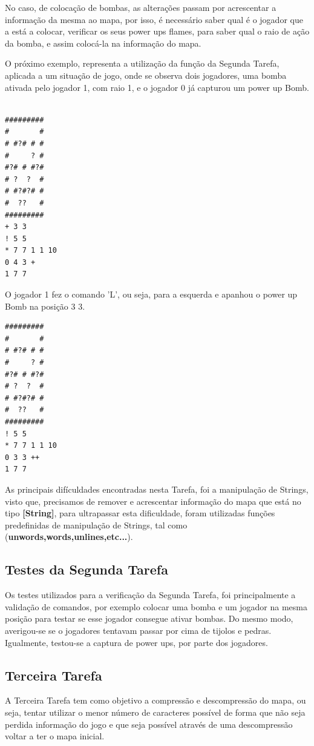 \documentclass[4apaper]{report}
\begin{document}
No caso, de colocação de bombas, as alterações passam por acrescentar a informação da mesma ao mapa, por isso, é necessário saber qual é o jogador que a está a colocar, verificar os seus power ups flames, para saber qual o raio de ação da bomba, e assim colocá-la na informação do mapa.

O próximo exemplo, representa a utilização da função da Segunda Tarefa, aplicada a um situação de jogo, onde se observa dois jogadores, uma bomba ativada pelo jogador 1, com raio 1, e o jogador 0 já capturou um power up Bomb.

\begin{verbatim}

#########
#       #
# #?# # #
#     ? #
#?# # #?#
# ?  ?  #
# #?#?# #
#  ??   #
#########
+ 3 3
! 5 5
* 7 7 1 1 10
0 4 3 +
1 7 7
\end{verbatim}

O jogador 1 fez o comando 'L', ou seja, para a esquerda e apanhou o power up Bomb na posição 3 3.

\begin{verbatim}
#########
#       #
# #?# # #
#     ? #
#?# # #?#
# ?  ?  #
# #?#?# #
#  ??   #
#########
! 5 5
* 7 7 1 1 10
0 3 3 ++
1 7 7

\end{verbatim}

As principais difículdades encontradas nesta Tarefa, foi a manipulação de Strings, visto que, precisamos de remover e acrescentar informação do mapa que está no tipo \textbf{[String]}, para ultrapassar esta dificuldade, foram utilizadas funções predefinidas de manipulação de Strings, tal como (\textbf{unwords,words,unlines,etc...}).

\subsection {Testes da Segunda Tarefa}
Os testes utilizados para a verificação da Segunda Tarefa, foi principalmente a validação de comandos, por exemplo colocar uma bomba e um jogador na mesma posição para testar se esse jogador consegue ativar bombas. Do mesmo modo, averigou-se se o jogadores tentavam passar por cima de tijolos e pedras. Igualmente, testou-se a captura de power ups, por parte dos jogadores.

\subsection{Terceira Tarefa}
A Terceira Tarefa tem como objetivo a compressão e descompressão do mapa, ou seja, tentar utilizar o menor número de caracteres possível de forma que não seja perdida informação do jogo e que seja possível através de uma descompressão voltar a ter o mapa inicial.
\end{document}

